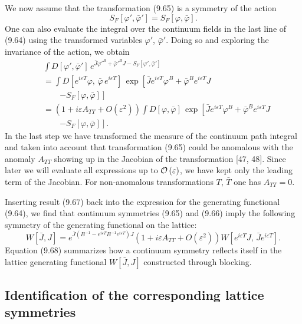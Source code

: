 We now assume that the transformation (9.65) is a symmetry of the action
\begin{equation}
  S_F[\varphi',\bar\varphi'] = S_F[\varphi,\bar\varphi] .
\end{equation}
One can also evaluate the integral over the continuum fields in the last line
of (9.64) using the transformed variables $\varphi'$, $\bar\varphi'$. Doing so
and exploring the invariance of the action, we obtain
\begin{align}
  &\int D[\varphi',\bar\varphi']\,e^{\bar J\varphi'^B + \bar\varphi'^B J - S_F[\varphi',\bar\varphi']} \nonumber\\
  &= \int D\left[e^{i\varepsilon T}\varphi,\,\bar\varphi\,e^{i\varepsilon T}\right]\,
     \exp\!\left[\bar J e^{i\varepsilon T}\varphi^B
       + \bar\varphi^B e^{i\varepsilon T}J\right. \nonumber\\
  &\qquad \left.- S_F[\varphi,\bar\varphi]\right] \nonumber\\
  &= \left(1 + i\varepsilon A_{TT} + O(\varepsilon^2)\right)
     \int D[\varphi,\bar\varphi]\,
     \exp\!\left[\bar J e^{i\varepsilon T}\varphi^B
       + \bar\varphi^B e^{i\varepsilon T}J\right. \nonumber\\
  &\qquad \left.- S_F[\varphi,\bar\varphi]\right] .
\end{align}
In the last step we have transformed the measure of the continuum path
integral and taken into account that transformation (9.65) could be anomalous
with the anomaly $A_{TT}$ showing up in the Jacobian of the transformation
[47, 48]. Since later we will evaluate all expressions up to $\mathcal{O}\left(\varepsilon\right)$,
we have kept only the leading term of the Jacobian. For non-anomalous
transformations $T$, $\bar T$ one has $A_{TT} = 0$.

Inserting result (9.67) back into the expression for the generating functional
(9.64), we find that continuum symmetries (9.65) and (9.66) imply the
following symmetry of the generating functional on the lattice:
\begin{equation}
  W[\bar J,J] = e^{\bar J\left(B^{-1} - e^{i\varepsilon T}B^{-1}e^{i\varepsilon T}\right)J}
    \left(1 + i\varepsilon A_{TT} + O(\varepsilon^2)\right)
    W\left[e^{i\varepsilon T}J,\,\bar J e^{i\varepsilon T}\right] .
\end{equation}
Equation (9.68) summarizes how a continuum symmetry reflects itself in the
lattice generating functional $W[\bar J,J]$ constructed through blocking.

\subsection{Identification of the corresponding lattice symmetries}
\label{sec:9.4.2}

